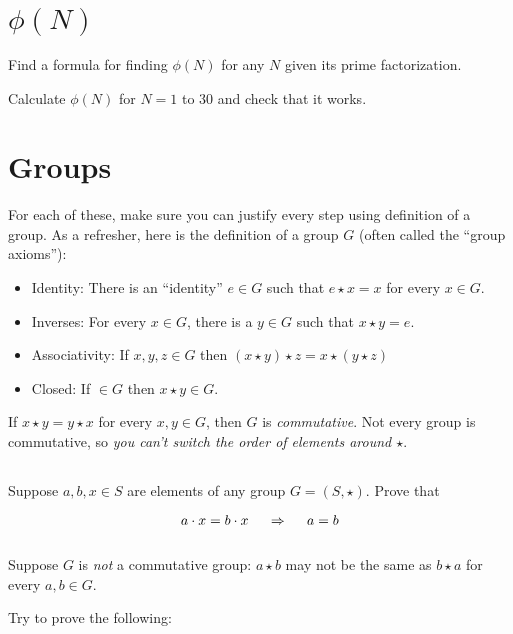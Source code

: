 \documentclass[12pt]{article}
\begin{document}
\section{$\phi(N)$}

Find a formula for finding $\phi(N)$ for any $N$ given its prime factorization.

Calculate $\phi(N)$ for $N = 1$ to $30$ and check that it works.



\section{Groups}

For each of these, make sure you can justify every step using definition of a group. As a refresher, here is the definition of a group $G$ (often called the ``group axioms''):

\begin{itemize}
\item Identity: There is an ``identity'' $e \in G$ such that $e \star x = x$ for every $x \in G$.
\item Inverses: For every $x \in G$, there is a $y \in G$ such that $x \star y = e$.
\item Associativity: If $x, y, z \in G$ then $(x \star y) \star z = x \star (y \star z)$
\item Closed: If $ \in G$ then $x \star y \in G$.
\end{itemize}

If $x \star y = y \star x$ for every $x, y \in G$, then $G$ is \emph{commutative}. Not every group is commutative, so \emph{you can't switch the order of elements around $\star$}.

\subsection{}

Suppose $a, b, x \in S$ are elements of any group $G = (S, \star)$. Prove that

$$
a \cdot x = b \cdot x ~~~~ \Rightarrow ~~~~ a = b
$$


\subsection{}

Suppose $G$ is \emph{not} a commutative group: $a \star b$ may not be the same as $b \star a$ for every $a, b \in G$.

Try to prove the following:
\end{document}
